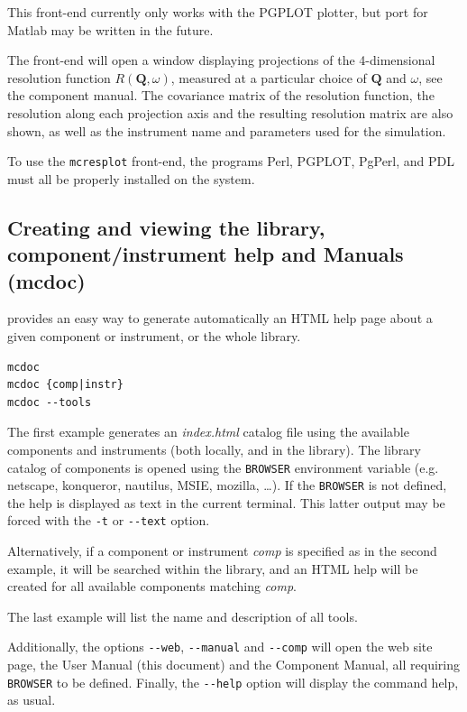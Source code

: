 This front-end currently only works with the PGPLOT plotter, but port for
Matlab may be written in the future.

The front-end will open a window displaying projections of the 4-dimensional
resolution function $R(\boldsymbol{Q}, \omega)$, measured at a
particular choice of $\boldsymbol{Q}$ and $\omega$, see the component
manual. The covariance matrix of the
resolution function, the resolution along each projection axis and the resulting
resolution matrix are also shown, as well as the instrument name and parameters
used for the simulation.

To use the \verb+mcresplot+ front-end, the programs Perl, PGPLOT, PgPerl,
and PDL must all be properly installed on the system.

\subsection{Creating and viewing the library, component/instrument help and
  Manuals (mcdoc)}
\label{s:mcdoc-run}

\MCS provides an easy way to generate automatically an HTML help page about a
given component or instrument, or the whole \MCS
library. 
\begin{lstlisting}
mcdoc
mcdoc {comp|instr}
mcdoc --tools
\end{lstlisting}
The first example generates an {\it index.html} catalog file using the available
components and instruments (both locally, and in the \MCS library). The library
catalog of components is opened using the \verb+BROWSER+ environment variable
 (e.g. netscape, konqueror, nautilus, MSIE,
mozilla, \ldots). If the \verb+BROWSER+ is not defined, the help is displayed as
text in the current terminal. This latter output may be forced with the
\verb+-t+ or \verb+--text+ option.

Alternatively, if a component or instrument {\it comp} is specified as in the
second example, it will be searched within the library, and an HTML help will be
created for all available components matching {\it comp}.

The last example will list the name and description of all \MCS tools.

Additionally, the options \verb+--web+, \verb+--manual+ and \verb+--comp+ will
open the \MCS web site page, the User Manual (this document) and the Component
Manual, all requiring \verb+BROWSER+ to be defined. Finally, the \verb+--help+
option will display the command help, as usual.

